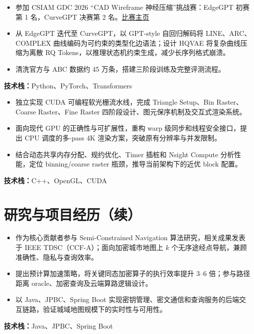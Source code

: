 \documentclass[11pt,a4paper]{article}
\begin{document}
\begin{itemize}
\item 参加 CSIAM GDC 2026 “CAD Wireframe 神经压缩”挑战赛：EdgeGPT 初赛第 1 名，CurveGPT 决赛第 2 名。\href{https://mathmagic-official.github.io/AICAD/}{比赛主页}
\item 从 EdgeGPT 迭代至 CurveGPT，以 GPT-style 自回归解码将 LINE、ARC、COMPLEX 曲线编码为可约束的类型化边语法；设计 HQVAE 将复杂曲线压缩为离散 RQ Tokens，以推理状态机约束生成，减少长序列格式崩溃。
\item 清洗官方与 ABC 数据约 45 万条，搭建三阶段训练及完整评测流程。
\end{itemize}
\textbf{技术栈：}Python、PyTorch、Transformers

\begin{itemize}
\item 独立实现 CUDA 可编程软光栅流水线，完成 Triangle Setup、Bin Raster、Coarse Raster、Fine Raster 四阶段设计、图元保序机制及交互式渲染系统。
\item 面向现代 GPU 的正确性与可扩展性，重构 warp 级同步和线程安全接口，提出 CPU 调度的多-pass 4K 渲染方案，突破原有分辨率与并发限制。
\item 结合动态共享内存分配、规约优化、Timer 插桩和 Nsight Compute 分析性能，定位 binning/coarse raster 瓶颈，推导当前架构下的近优 block 配置。
\end{itemize}
\textbf{技术栈：}C++、OpenGL、CUDA

\newpage
\section{研究与项目经历（续）}
\begin{itemize}
\item 作为核心贡献者参与 Semi-Constrained Navigation 算法研究，相关成果发表于 IEEE TDSC（CCF-A）；面向加密城市地图上 $k$ 个无序途经点导航，兼顾准确性、隐私与查询效率。
\item 提出预计算加速策略，将关键同态加密算子的执行效率提升 3--6 倍；参与路径距离 oracle、加密查询及云端算路逻辑设计。
\item 以 Java、JPBC、Spring Boot 实现密钥管理、密文通信和查询服务的后端交互链路，验证城域地图规模下的实时性与可用性。
\end{itemize}
\textbf{技术栈：}Java、JPBC、Spring Boot
\end{document}
